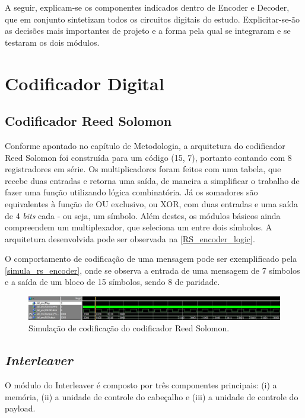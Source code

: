 	A seguir, explicam-se os componentes indicados dentro de Encoder e Decoder, que em conjunto sintetizam todos os circuitos digitais do estudo. Explicitar-se-ão as decisões mais importantes de projeto e a forma pela qual se integraram e se testaram os dois módulos. 
	
	\section{Codificador Digital}
	
	\subsection{Codificador Reed Solomon}
	
	Conforme apontado no capítulo de Metodologia, a arquitetura do codificador Reed Solomon foi construída para um código (15, 7), portanto contando com 8 registradores em série. Os multiplicadores foram feitos com uma tabela,  que recebe duas entradas e retorna uma saída, de maneira a simplificar o trabalho de fazer uma função utilizando lógica combinatória. Já os somadores são equivalentes à função de OU exclusivo, ou XOR, com duas entradas e uma saída de 4 \textit{bits} cada - ou seja, um símbolo. Além destes, os módulos básicos ainda compreendem um multiplexador, que seleciona um entre dois símbolos. A arquitetura desenvolvida pode ser observada na \autoref{RS_encoder_logic}.
	
	O comportamento de codificação de uma mensagem pode ser exemplificado pela \autoref{simula_rs_encoder}, onde se observa a entrada de uma mensagem de 7 símbolos e a saída de um bloco de 15 símbolos, sendo 8 de paridade.
	
	\begin{figure}[h]
		\caption{\label{simula_rs_encoder}Simulação de codificação do codificador Reed Solomon.}
		\centering
		\includegraphics[width=1\textwidth]{RS/Sim_encoder}
	\end{figure}
	
	\subsection{\textit{Interleaver}}

	O módulo do Interleaver é composto por três componentes principais: (i) a memória, (ii) a unidade de controle do cabeçalho e (iii) a unidade de controle do payload.

